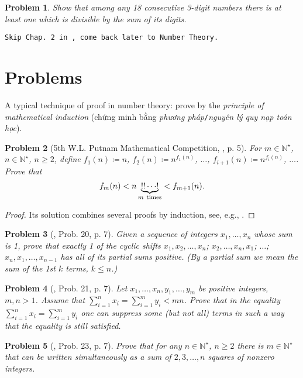 \documentclass[oneside]{book}
\numberwithin{equation}{section}
\newtheorem{problem}{Problem}[section]
\begin{document}
\begin{problem}
	Show that among any 18 consecutive 3-digit numbers there is at least one which is divisible by the sum of its digits.
\end{problem}
\texttt{Skip Chap. 2 in \cite{Tao2006}, come back later to Number Theory.}

\section{Problems}
A typical technique of proof in number theory: prove by the \textit{principle of mathematical induction} (chứng minh bằng \textit{phương pháp}\texttt{/}\textit{nguyên lý quy nạp toán học}).

\begin{problem}[5th W.L. Putnam Mathematical Competition, \cite{Gelca_Andreescu2017}, p. 5]
	For $m\in\mathbb{N}^\star$, $n\in\mathbb{N}^\star$, $n\ge 2$, define $f_1(n)\coloneqq n$, $f_2(n)\coloneqq n^{f_1(n)}$, $\ldots$, $f_{i+1}(n)\coloneqq n^{f_i(n)}$, $\ldots$. Prove that
	\begin{align*}
		f_m(n) < n\underbrace{!!\cdots!}_{m\ {\rm times}} < f_{m+1}(n).
	\end{align*}
\end{problem}

\begin{proof}[Proof]
	Its solution combines several proofs by induction, see, e.g., \cite[pp. 5--6]{Gelca_Andreescu2017}.
\end{proof}

\begin{problem}[\cite{Gelca_Andreescu2017}, Prob. 20, p. 7]
	Given a sequence of integers $x_1,\ldots,x_n$ whose sum is 1, prove that exactly 1 of the cyclic shifts $x_1,x_2,\ldots,x_n$; $x_2,\ldots,x_n,x_1$; $\ldots$; $x_n,x_1,\ldots,x_{n-1}$ has all of its partial sums positive. (By a \emph{partial sum} we mean the sum of the 1st $k$ terms, $k\le n$.)
\end{problem}

\begin{problem}[\cite{Gelca_Andreescu2017}, Prob. 21, p. 7]
	Let $x_1,\ldots,x_n,y_1,\ldots,y_m$ be positive integers, $m,n > 1$. Assume that $\sum_{i=1}^n x_i = \sum_{i=1}^m y_i < mn$. Prove that in the equality $\sum_{i=1}^n x_i = \sum_{i=1}^m y_i$ one can suppress some (but not all) terms in such a way that the equality is still satisfied.
\end{problem}

\begin{problem}[\cite{Gelca_Andreescu2017}, Prob. 23, p. 7]
	Prove that for any $n\in\mathbb{N}^\star$, $n\ge 2$ there is $m\in\mathbb{N}^\star$ that can be written simultaneously as a sum of $2,3,\ldots,n$ squares of nonzero integers.
\end{problem}
\end{document}
